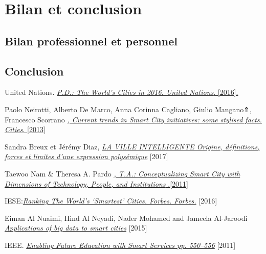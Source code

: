 \documentclass[french, a4paper, 12pt]{report}
\begin{document}
\chapter{Bilan et conclusion}
\section{Bilan professionnel et personnel}
\section{Conclusion}


% 
%  
{} 
\begin{thebibliography}{9}
United Nations. \href{https://www.un.org/en/development/desa/population/publications/pdf/urbanization/the_worlds_cities_in_2016_data_booklet.pdf}{\emph{P.D.: The World’s Cities in 2016. United Nations}. [2016].} 

 Paolo Neirotti, Alberto De Marco, Anna Corinna Cagliano, Giulio Mangano⇑, Francesco Scorrano \href{https://www.researchgate.net/publication/260015335_Current_trends_in_Smart_City_initiatives_Some_stylised_facts}{\emph{, Current trends in Smart City initiatives: some stylised facts. Cities}. [2013]} 

  Sandra Breux et Jérémy Diaz, \href{http://espace.inrs.ca/4917/1/Rapport-LaVilleIntelligente.pdf}{\emph{LA VILLE INTELLIGENTE Origine, définitions, forces et limites d’une expression polysémique}} [2017]

 Taewoo Nam \& Theresa A. Pardo \href{https://inta-aivn.org/images/cc/Urbanism/background\%20documents/dgo_2011_smartcity.pdf}{\emph{, T.A.: Conceptualizing Smart City with Dimensions of Technology, People, and Institutions }.[2011]} 


IESE:\href{https://www.forbes.com/sites/iese/2019/05/21/these-are-the-smartest-cities-in-the-world-for-2019/}{\emph{Ranking The World’s ‘Smartest’ Cities. Forbes. Forbes.}} [2016]

Eiman Al Nuaimi, Hind Al Neyadi, Nader Mohamed and Jameela Al-Jaroodi \href{https://jisajournal.springeropen.com/articles/10.1186/s13174-015-0041-5}{\emph{Applications of big data to smart cities}} [2015]

IEEE. \href{https://ieeexplore.ieee.org/abstract/document/5958132}{\emph{Enabling Future Education with Smart Services pp. 550–556}} [2011]


\end{thebibliography}
\end{document}
